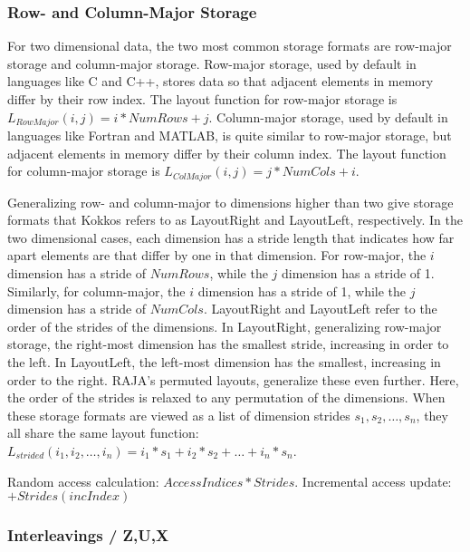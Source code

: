 \subsubsection{Row- and Column-Major Storage}
For two dimensional data, the two most common storage formats are row-major storage and column-major storage.
Row-major storage, used by default in languages like C and C++, stores data so that adjacent elements in memory differ by their row index. 
The layout function for row-major storage is $L_{RowMajor}(i,j) = i * NumRows + j$.
Column-major storage, used by default in languages like Fortran and MATLAB, is quite similar to row-major storage, but adjacent elements in memory differ by their column index.
The layout function for column-major storage is $L_{ColMajor}(i,j) = j * NumCols + i$.

Generalizing row- and column-major to dimensions higher than two give storage formats that Kokkos refers to as LayoutRight and LayoutLeft, respectively. 
In the two dimensional cases, each dimension has a stride length that indicates how far apart elements are that differ by one in that dimension.
For row-major, the $i$ dimension has a stride of $NumRows$, while the $j$ dimension has a stride of 1.
Similarly, for column-major, the $i$ dimension has a stride of 1, while the $j$ dimension has a stride of $NumCols$.
LayoutRight and LayoutLeft refer to the order of the strides of the dimensions.
In LayoutRight, generalizing row-major storage, the right-most dimension has the smallest stride, increasing in order to the left.
In LayoutLeft, the left-most dimension has the smallest, increasing in order to the right.
RAJA's permuted layouts, generalize these even further.
Here, the order of the strides is relaxed to any permutation of the dimensions.
When these storage formats are viewed as a list of dimension strides $s_1,s_2,\dots,s_n$, they all share the same layout function: $L_{strided} (i_1,i_2,\dots,i_n) = i_1 * s_1 + i_2 * s_2 + \dots + i_n * s_n$.


Random access calculation: $AccessIndices * Strides$. 
Incremental access update: $+Strides(incIndex)$

\subsubsection{Interleavings / Z,U,X}

